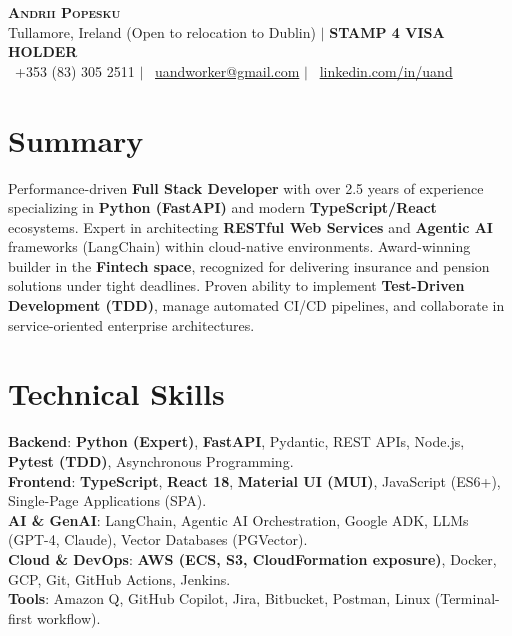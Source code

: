 \documentclass[letterpaper,11pt]{article}
\begin{document}
\begin{center}
    \textbf{\Huge \scshape Andrii Popesku} \\ \vspace{3pt}
    \small Tullamore, Ireland (Open to relocation to Dublin) $|$ \textbf{STAMP 4 VISA HOLDER} \\
    \small \faPhone\ +353 (83) 305 2511 $|$ \faEnvelope\ \href{mailto:uandworker@gmail.com}{uandworker@gmail.com} $|$ 
    \faLinkedin\ \href{https://linkedin.com/in/uand}{linkedin.com/in/uand}
\end{center}

\section{Summary}
\small{Performance-driven \textbf{Full Stack Developer} with over 2.5 years of experience specializing in \textbf{Python (FastAPI)} and modern \textbf{TypeScript/React} ecosystems. Expert in architecting \textbf{RESTful Web Services} and \textbf{Agentic AI} frameworks (LangChain) within cloud-native environments. Award-winning builder in the \textbf{Fintech space}, recognized for delivering insurance and pension solutions under tight deadlines. Proven ability to implement \textbf{Test-Driven Development (TDD)}, manage automated CI/CD pipelines, and collaborate in service-oriented enterprise architectures.}

\section{Technical Skills}
 \begin{itemize}[leftmargin=0.15in, label={}]
    \small{\item{
     \textbf{Backend}{: \textbf{Python (Expert)}, \textbf{FastAPI}, Pydantic, REST APIs, Node.js, \textbf{Pytest (TDD)}, Asynchronous Programming.} \\
     \textbf{Frontend}{: \textbf{TypeScript}, \textbf{React 18}, \textbf{Material UI (MUI)}, JavaScript (ES6+), Single-Page Applications (SPA).} \\
     \textbf{AI \& GenAI}{: LangChain, Agentic AI Orchestration, Google ADK, LLMs (GPT-4, Claude), Vector Databases (PGVector).} \\
     \textbf{Cloud \& DevOps}{: \textbf{AWS (ECS, S3, CloudFormation exposure)}, Docker, GCP, Git, GitHub Actions, Jenkins.} \\
     \textbf{Tools}{: Amazon Q, GitHub Copilot, Jira, Bitbucket, Postman, Linux (Terminal-first workflow).}
    }}
 \end{itemize}
\end{document}
